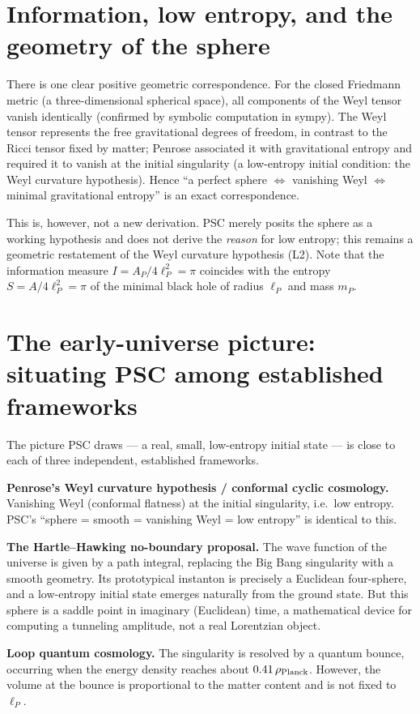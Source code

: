 \documentclass[11pt,a4paper]{article}
\newcommand{\eP}{\ell_P}
\begin{document}
\section{Information, low entropy, and the geometry of the sphere}
There is one clear positive geometric correspondence. For the closed Friedmann metric (a three-dimensional spherical space), all components of the Weyl tensor vanish identically (confirmed by symbolic computation in sympy). The Weyl tensor represents the free gravitational degrees of freedom, in contrast to the Ricci tensor fixed by matter; Penrose associated it with gravitational entropy and required it to vanish at the initial singularity (a low-entropy initial condition: the Weyl curvature hypothesis). Hence ``a perfect sphere $\Leftrightarrow$ vanishing Weyl $\Leftrightarrow$ minimal gravitational entropy'' is an exact correspondence.

This is, however, not a new derivation. PSC merely posits the sphere as a working hypothesis and does not derive the \emph{reason} for low entropy; this remains a geometric restatement of the Weyl curvature hypothesis (L2). Note that the information measure $I = A_P/4\eP^2 = \pi$ coincides with the entropy $S = A/4\eP^2 = \pi$ of the minimal black hole of radius $\eP$ and mass $m_P$.

\section{The early-universe picture: situating PSC among established frameworks}
The picture PSC draws --- a real, small, low-entropy initial state --- is close to each of three independent, established frameworks.

\textbf{Penrose's Weyl curvature hypothesis / conformal cyclic cosmology.} Vanishing Weyl (conformal flatness) at the initial singularity, i.e.\ low entropy. PSC's ``sphere = smooth = vanishing Weyl = low entropy'' is identical to this.

\textbf{The Hartle--Hawking no-boundary proposal.} The wave function of the universe is given by a path integral, replacing the Big Bang singularity with a smooth geometry. Its prototypical instanton is precisely a Euclidean four-sphere, and a low-entropy initial state emerges naturally from the ground state. But this sphere is a saddle point in imaginary (Euclidean) time, a mathematical device for computing a tunneling amplitude, not a real Lorentzian object.

\textbf{Loop quantum cosmology.} The singularity is resolved by a quantum bounce, occurring when the energy density reaches about $0.41\,\rho_{\rm Planck}$. However, the volume at the bounce is proportional to the matter content and is not fixed to $\eP$.
\end{document}
